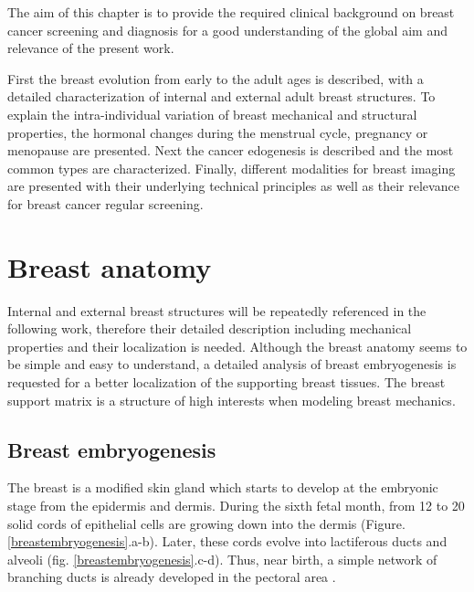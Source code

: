 

The aim of this chapter is to provide the required clinical background on breast cancer screening and diagnosis for a good understanding of the global aim and relevance of the present work. 

First the breast evolution from early to the adult ages is described, with a detailed characterization of internal and external adult breast structures. To explain the intra-individual variation of breast mechanical and structural properties, the hormonal changes during the menstrual cycle, pregnancy or menopause are presented.   Next the cancer edogenesis is described and the most common types are characterized. Finally, different modalities for breast imaging are presented with their underlying technical principles as well as their relevance for breast cancer regular screening.

\clearpage
\section{Breast anatomy}\label{section:breastanatomy}

Internal and external breast structures will be repeatedly referenced in the following work, therefore their detailed description including mechanical properties and their localization is needed. Although the breast anatomy seems to be simple and easy to understand, a detailed analysis of breast embryogenesis is requested for a better localization of the supporting breast tissues. The breast support matrix is a structure of high interests when modeling breast mechanics.  

  
\subsection{Breast embryogenesis}\label{subsection:breastembryogenesis}

The breast is a modified skin gland which starts to develop at the embryonic stage from the epidermis and dermis.  During the sixth fetal month, from 12 to 20 solid cords of epithelial cells are growing down into the dermis (Figure. \ref{breastembryogenesis}.a-b). Later, these cords evolve into lactiferous ducts and alveoli (fig. \ref{breastembryogenesis}.c-d). Thus, near birth, a simple network of branching ducts is already developed in the pectoral area \citep{skandalakis_embryology_2009}.
 

